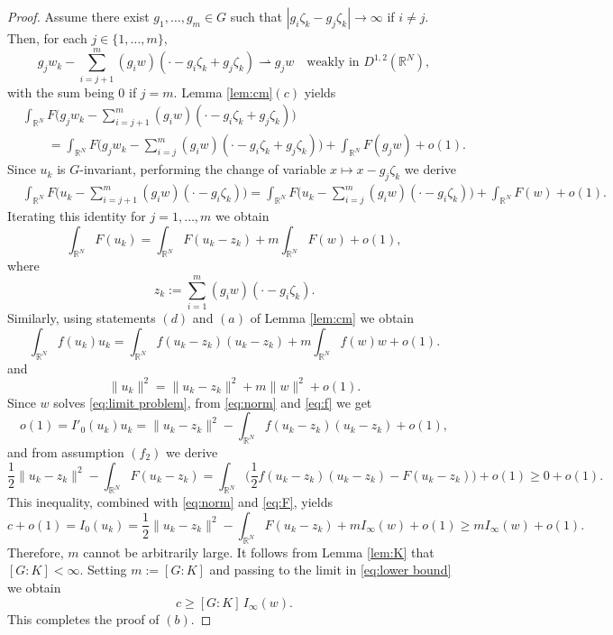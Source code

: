 \documentclass[10pt,letterpaper]{article}
\numberwithin{equation}{section}
\def\r{\mathbb{R}}
\def\rn{\mathbb{R}^N}
\def\rh{\rightharpoonup}
\def\irn{\int_{\r^N}}
\begin{document}
\begin{proof}
Assume there exist $g_1,\ldots, g_m \in G$ such that $|g_i\zeta_k- g_j\zeta_k|\to\infty$ if $i \neq j$. Then, for each $j\in\{1,\ldots,m\}$,
$$g_j w_k - \sum_{i=j+1}^{m} (g_i w)(\cdot - g_i \zeta_k + g_j \zeta_k) \rh g_j  w \quad \text{weakly in \ } D^{1,2}(\rn),$$
with the sum being $0$ if $j=m$. Lemma \ref{lem:cm}$(c)$ yields
\begin{align*}
&\irn F\Big(g_jw_k - \sum_{i=j+1}^{m} (g_iw)(\cdot - g_i \zeta_k + g_j \zeta_k) \Big)\\
&\qquad= \irn F\Big(g_j w_k - \sum_{i=j}^{m} (g_iw)(\cdot - g_i \zeta_k + g_j \zeta_k)\Big) + \irn F(g_j w) + o(1).
\end{align*}
Since $u_k$  is $G$-invariant, performing the change of variable $x \mapsto x - g_j \zeta_k$ we derive
\begin{align*}
&\irn F\Big(u_k - \sum_{i=j+1}^{m} (g_i w)(\cdot - g_i \zeta_k ) \Big)= \irn F\Big(u_k - \sum_{i=j}^{m} (g_iw)(\cdot - g_i \zeta_k ) \Big) + \irn F(w) + o(1).
\end{align*}
Iterating this identity for $j= 1,\ldots, m$ we obtain
\begin{equation} \label{eq:F}
\irn F(u_k)=\irn F(u_k - z_k)+m\irn F(w) + o(1),
\end{equation}
where
$$z_k:=\sum_{i=1}^{m} (g_iw)(\cdot - g_i \zeta_k).$$
Similarly, using statements $(d)$ and $(a)$ of Lemma \ref{lem:cm} we obtain
\begin{equation} \label{eq:f}
\irn f(u_k)u_k=\irn f(u_k - z_k)(u_k - z_k)+m\irn f(w)w+o(1).
\end{equation}
and
\begin{equation}\label{eq:norm}
\|u_k\|^2 = \|u_k - z_k\|^2 + m \|w\|^2 + o(1).
\end{equation}
Since $w$ solves \eqref{eq:limit problem}, from \eqref{eq:norm} and \eqref{eq:f} we get
$$o(1)=I'_0(u_k)u_k=\|u_k-z_k\|^2-\irn f(u_k-z_k)(u_k-z_k)+o(1),$$
and from assumption $(f_2)$ we derive
$$\frac{1}{2}\|u_k-z_k\|^2-\irn F(u_k-z_k)=\irn\Big(\frac{1}{2}f(u_k-z_k)(u_k-z_k)-F(u_k-z_k)\Big)+o(1)\geq 0+o(1).$$
This inequality, combined with \eqref{eq:norm} and \eqref{eq:F}, yields
\begin{equation}\label{eq:lower bound}
c+o(1)=I_0(u_k)=\frac{1}{2}\|u_k-z_k\|^2-\irn F(u_k-z_k)+mI_\infty(w)+o(1)\geq mI_\infty(w)+o(1).
\end{equation}
Therefore, $m$ cannot be arbitrarily large. It follows from Lemma \ref{lem:K} that $[G:K]<\infty$. Setting $m:=[G:K]$ and passing to the limit in \eqref{eq:lower bound} we obtain
$$c\geq [G:K]\,I_\infty(w).$$
This completes the proof of $(b)$.
\end{proof}
\end{document}
